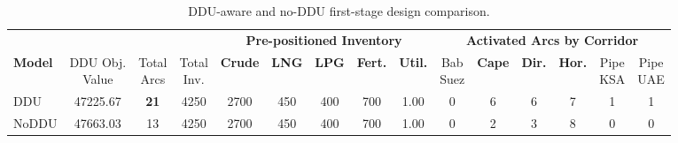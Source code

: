 \documentclass[final,3p,authoryear]{elsarticle}
\theoremstyle{definition}
\begin{document}
\begin{table}[htbp] %
\centering
\caption{DDU-aware and no-DDU first-stage design comparison.}
\label{tab:tab04_design_comparison}
\footnotesize 
\setlength{\tabcolsep}{2pt} %
\begin{tabularx}{\textwidth}{l c c c ccccc cccccc}
\toprule
& & & & \multicolumn{5}{c}{\textbf{Pre-positioned Inventory}} & \multicolumn{6}{c}{\textbf{Activated Arcs by Corridor}} \\
\cmidrule(lr){5-9} \cmidrule(lr){10-15}
\textbf{Model} & \thead{DDU Obj.\\Value} & \thead{Total\\Arcs} & \thead{Total\\Inv.} & \textbf{Crude} & \textbf{LNG} & \textbf{LPG} & \textbf{Fert.} & \textbf{Util.} & \thead{Bab\\Suez} & \textbf{Cape} & \textbf{Dir.} & \textbf{Hor.} & \thead{Pipe\\KSA} & \thead{Pipe\\UAE} \\
\midrule
DDU   & 47225.67 & \textbf{21} & 4250 & 2700 & 450 & 400 & 700 & 1.00 & 0 & 6 & 6 & 7 & 1 & 1 \\
NoDDU & 47663.03 & 13 & 4250 & 2700 & 450 & 400 & 700 & 1.00 & 0 & 2 & 3 & 8 & 0 & 0 \\
\bottomrule
\end{tabularx}
\end{table}
\end{document}
